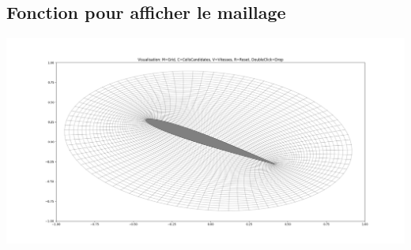 \documentclass[11pt]{article}
\makeatletter
\def\maxwidth{\ifdim\Gin@nat@width>\linewidth\linewidth
    \else\Gin@nat@width\fi}
\let\Oldincludegraphics\includegraphics
\renewcommand{\includegraphics}[1]{\Oldincludegraphics[width=.8\maxwidth]{#1}}
\makeatother
\begin{document}
    \hypertarget{fonction-pour-afficher-le-maillage}{%
\subsection{Fonction pour afficher le
maillage}\label{fonction-pour-afficher-le-maillage}}

\includegraphics{docs/matplotlib_m.png}
\end{document}
